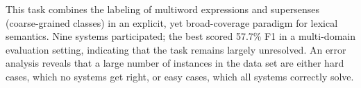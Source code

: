 This task combines the labeling of multiword expressions and supersenses (coarse-grained classes) in an explicit, yet broad-coverage paradigm for lexical semantics. Nine systems participated; the best scored 57.7\% F1 in a multi-domain evaluation setting, indicating that the task remains largely unresolved. An error analysis reveals that a large number of instances in the data set are either hard cases, which no systems get right, or easy cases, which all systems correctly solve.
